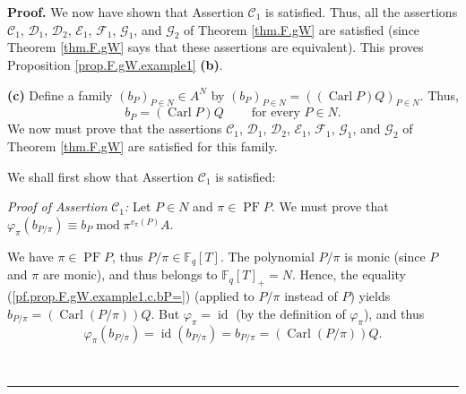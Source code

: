 \documentclass[numbers=enddot,12pt,final,onecolumn,notitlepage]{scrartcl}%
\theoremstyle{definition}
\newenvironment{proof}[1][Proof]{\noindent\textbf{#1.} }{\ \rule{0.5em}{0.5em}}
\begin{document}
\begin{proof}
We now have shown that Assertion $\mathcal{C}_{1}$ is satisfied. Thus, all the
assertions $\mathcal{C}_{1}$, $\mathcal{D}_{1}$, $\mathcal{D}_{2}$,
$\mathcal{E}_{1}$, $\mathcal{F}_{1}$, $\mathcal{G}_{1}$, and $\mathcal{G}_{2}$
of Theorem \ref{thm.F.gW} are satisfied (since Theorem \ref{thm.F.gW} says
that these assertions are equivalent). This proves Proposition
\ref{prop.F.gW.example1} \textbf{(b)}. \medskip

\textbf{(c)} Define a family $\left(  b_{P}\right)  _{P\in N}\in A^{N}$ by
$\left(  b_{P}\right)  _{P\in N}=\left(  \left(  \operatorname*{Carl}P\right)
Q\right)  _{P\in N}$. Thus,%
\begin{equation}
b_{P}=\left(  \operatorname*{Carl}P\right)  Q\ \ \ \ \ \ \ \ \ \ \text{for
every }P\in N. \label{pf.prop.F.gW.example1.c.bP=}%
\end{equation}
We now must prove that the assertions $\mathcal{C}_{1}$, $\mathcal{D}_{1}$,
$\mathcal{D}_{2}$, $\mathcal{E}_{1}$, $\mathcal{F}_{1}$, $\mathcal{G}_{1}$,
and $\mathcal{G}_{2}$ of Theorem \ref{thm.F.gW} are satisfied for this family.

We shall first show that Assertion $\mathcal{C}_{1}$ is satisfied:

\textit{Proof of Assertion }$\mathcal{C}_{1}$\textit{:} Let $P\in N$ and
$\pi\in\operatorname*{PF}P$. We must prove that $\varphi_{\pi}\left(
b_{P/\pi}\right)  \equiv b_{P}\operatorname{mod}\pi^{v_{\pi}\left(  P\right)
}A$.

We have $\pi\in\operatorname*{PF}P$, thus $P/\pi\in\mathbb{F}_{q}\left[
T\right]  $. The polynomial $P/\pi$ is monic (since $P$ and $\pi$ are monic),
and thus belongs to $\mathbb{F}_{q}\left[  T\right]  _{+}=N$. Hence, the
equality (\ref{pf.prop.F.gW.example1.c.bP=}) (applied to $P/\pi$ instead of
$P$) yields $b_{P/\pi}=\left(  \operatorname*{Carl}\left(  P/\pi\right)
\right)  Q$. But $\varphi_{\pi}=\operatorname*{id}$ (by the definition of
$\varphi_{\pi}$), and thus%
\begin{equation}
\varphi_{\pi}\left(  b_{P/\pi}\right)  =\operatorname*{id}\left(  b_{P/\pi
}\right)  =b_{P/\pi}=\left(  \operatorname*{Carl}\left(  P/\pi\right)
\right)  Q. \label{pf.prop.F.gW.example1.c.1}%
\end{equation}



\end{proof}
\end{document}
